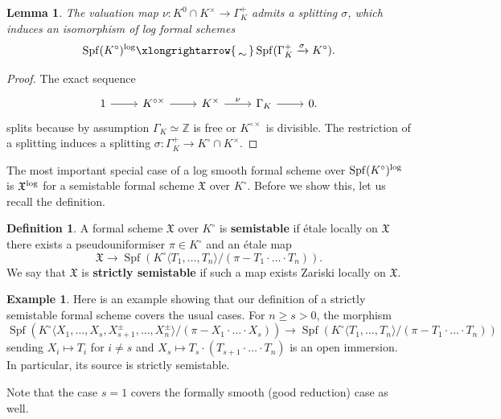 \documentclass[a4paper,twoside,11pt,reqno]{amsart}
\renewcommand{\mathbb}{\mathds}
\newcommand{\bZ}{{\mathbb Z}}
\newcommand{\fX}{{\mathfrak{X}}}
\newcommand{\isomto}{\xlongrightarrow{\,\smash{\raisebox{-0.65ex} 
    {\ensuremath{\displaystyle\sim}}}\,}}
\newcommand{\la}{\longrightarrow}
\DeclareMathOperator{\Spf}{Spf}
\newtheorem{lem}[thm]{Lemma}
\theoremstyle{definition}
\newtheorem{defi}[thm]{Definition}
\newtheorem{ex}[thm]{Example}
\numberwithin{equation}{subsection}
\begin{document}
\begin{lem} \label{lem:spf-Kcirc-satisfies364}
    The valuation map $\nu \colon K^0 \cap K^\times \to \Gamma_K^+$ admits a splitting $\sigma$, which induces an isomorphism of log formal schemes
    \[
    \Spf(K^\circ)^{\log} \isomto \Spf(\Gamma_K^+ \xrightarrow{\sigma} K^\circ).
    \]
\end{lem}
\begin{proof} 
    The exact sequence 
    \[
        \begin{tikzcd}
            1 \ar[r] & K^{\circ\times} \ar[r] & K^\times \ar[r,"\nu"] & \Gamma_K\ar[r] & 0.
        \end{tikzcd}
    \]
   splits because by assumption $\Gamma_K \simeq \bZ$ is free or $K^{\circ \times}$ is divisible. The restriction of a splitting induces a splitting $\sigma \colon \Gamma_K^+ \to K^\circ \cap K^\times$. 
\end{proof}


The most important special case of a log smooth formal scheme over $\Spf(K^\circ)^{\rm log}$ is $\fX^{\rm log}$ for a semistable formal scheme $\fX$ over $K^\circ$. Before we show this, let us recall the definition. 

\begin{defi} \label{def:ss-formal-sch}
    A formal scheme $\fX$ over $K^\circ$ is {\bf semistable} if \'etale locally on $\fX$ there exists a pseudouniformiser $\pi\in K^\circ$ and an \'etale map
    \[
        \fX \la \Spf\left( K^\circ\langle T_1,\dots, T_n\rangle/(\pi - T_1\cdot\ldots\cdot T_n) \right).
    \]
    We say that $\fX$ is {\bf strictly semistable} if such a map exists Zariski locally on $\fX$. 
\end{defi}

\begin{ex} \label{ex:standard-log-structure-Kcirc}
    Here is an example showing that our definition of a strictly semistable formal scheme covers the usual cases. For $n \geq s > 0$, the morphism
    \[
    \Spf(K^\circ\langle X_1,\ldots, X_s, X_{s+1}^\pm, \ldots, X_n^\pm\rangle/(\pi - X_1 \cdot \ldots \cdot X_s)) \to \Spf( K^\circ\langle T_1,\dots, T_n\rangle/(\pi - T_1\cdot\ldots\cdot T_n))
    \]
    sending $X_i \mapsto T_i$ for $i \not= s$ and $X_s \mapsto T_s \cdot(T_{s+1} \cdot \ldots \cdot T_n)$ is an open immersion. In particular, its source is strictly semistable. 

    Note that the case $s=1$ covers the formally smooth (good reduction) case as well.
\end{ex}
\end{document}
